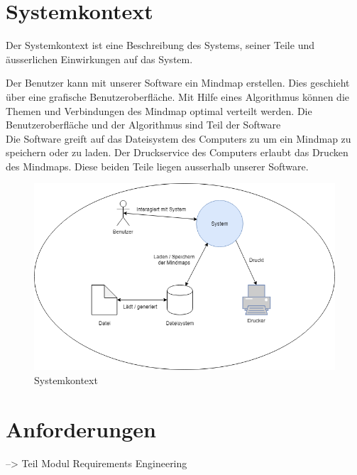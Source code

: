 \section{Systemkontext}
\label{sec:systemkontext}
Der Systemkontext ist eine Beschreibung des Systems, seiner Teile und äusserlichen Einwirkungen auf das System.

Der Benutzer kann mit unserer Software ein Mindmap erstellen. Dies geschieht über eine grafische Benutzeroberfläche. Mit Hilfe eines Algorithmus können die Themen und Verbindungen des Mindmap optimal verteilt werden. Die Benutzeroberfläche und der Algorithmus sind Teil der Software\\
Die Software greift auf das Dateisystem des Computers zu um ein Mindmap zu speichern oder zu laden. Der Druckservice des Computers erlaubt das Drucken des Mindmaps. Diese beiden Teile liegen ausserhalb unserer Software.

\begin{figure}[H]
	\centering
		\includegraphics[scale=0.7]{images/Systemkontext.png}
	\caption{Systemkontext}
	\label{fig:systemkontext}
\end{figure}

\section{Anforderungen}
\label{sec:anforderungen}
--> Teil Modul Requirements Engineering
